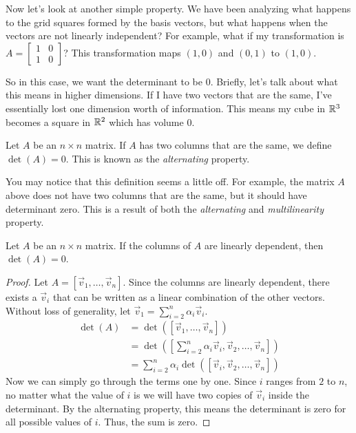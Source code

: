 Now let's look at another simple property. We have been analyzing what happens to the grid squares formed by the basis vectors, but what happens when the vectors are not linearly independent? For example, what if my transformation is $A=\begin{bmatrix}
    1 & 0 \\ 1 & 0
\end{bmatrix}$? This transformation maps $(1,0)$ and $(0,1)$ to $(1,0)$.

So in this case, we want the determinant to be $0$. Briefly, let's talk about what this means in higher dimensions. If I have two vectors that are the same, I've essentially lost one dimension worth of information. This means my cube in $\mathbb{R}^3$ becomes a square in $\mathbb{R}^2$ which has volume $0$.
\begin{definition}
    Let $A$ be an $n\times n$ matrix. If $A$ has two columns that are the same, we define $\det(A)=0$. This is known as the \textit{alternating} property.
\end{definition}
You may notice that this definition seems a little off. For example, the matrix $A$ above does not have two columns that are the same, but it should have determinant zero. This is a result of both the \textit{alternating} and \textit{multilinearity} property.
\begin{theorem}
    Let $A$ be an $n\times n$ matrix. If the columns of $A$ are linearly dependent, then $\det(A)=0$.
\end{theorem}
\begin{proof}
    Let $A=[\vec{v}_1,\dots,\vec{v}_n]$. Since the columns are linearly dependent, there exists a $\vec{v}_i$ that can be written as a linear combination of the other vectors. Without loss of generality, let $\vec{v}_1=\sum_{i=2}^n\alpha_i\vec{v}_i$.
    \begin{align*}
        \det(A)&=\det([\vec{v}_1,\dots,\vec{v}_n])\\
        &=\det([\sum_{i=2}^n\alpha_i\vec{v}_i,\vec{v}_2,\dots,\vec{v}_n])\\
        &=\sum_{i=2}^n\alpha_i\det([\vec{v}_i,\vec{v}_2,\dots,\vec{v}_n])\tag{by Multilinearity}
    \end{align*}
    Now we can simply go through the terms one by one. Since $i$ ranges from $2$ to $n$, no matter what the value of $i$ is we will have two copies of $\vec{v}_i$ inside the determinant. By the alternating property, this means the determinant is zero for all possible values of $i$. Thus, the sum is zero.
\end{proof}
